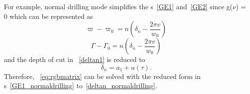 For example, normal drilling mode simplifies the \equationname{}s~\ref{GE1} and~\ref{GE2} since g($\nu$) = 0 which can be represented as
\begin{equation}\label{GE1_normaldrilling}
  \varpi-\varpi_0 = n\left(\delta_n - \frac{2\pi v}{w_0}\right)
\end{equation}
\begin{equation}\label{GE2_normaldrilling}
  \Gamma-\Gamma_0 = n\left(\delta_n - \frac{2\pi v}{w_0}\right)
\end{equation}
and the depth of cut in \equationname~\ref{deltan1} is reduced to
\begin{equation}\label{deltan_normaldrilling}
  \delta_n = a_1 + u(\tau).
\end{equation}
Therefore, \equationname~\ref{eq:rgbmatrix} can be solved with the reduced form in \equationname{}s~\ref{GE1_normaldrilling} to~\ref{deltan_normaldrilling}.
